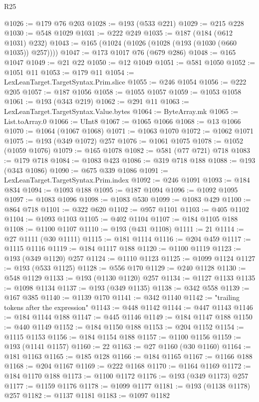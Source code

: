 \begin{lexlean}{R25}
\begin{coremodule}
@1026 := @179 @76 @203
@1028 := @193 (@533 @221)
@1029 := @215 @228
@1030 := @548 @1029
@1031 := @222 @249
@1035 := @187 (@184 (@612 @1031) @232)
@1043 := @165 (@1024 (@1026 (@1028 (@193 (@1030 (@660 @1035)) @257))))
@1047 := @173 @1017 @76 (@679 @286)
@1048 := @165 @1047
@1049 := @21 @22
@1050 := @12 @1049
@1051 := @581 @1050
@1052 := @1051 @11
@1053 := @179 @11
@1054 := LexLeanTarget.TargetSyntax.Prim.slice
@1055 := @246 @1054
@1056 := @222 @205
@1057 := @187 @1056
@1058 := @1055 @1057
@1059 := @1053 @1058
@1061 := @193 (@343 @219)
@1062 := @291 @11
@1063 := LexLeanTarget.TargetSyntax.Value.bytes
@1064 := ByteArray.mk
@1065 := List.toArray.{0}
@1066 := UInt8
@1067 := @1065 @1066
@1068 := @13 @1066
@1070 := @1064 (@1067 @1068)
@1071 := @1063 @1070
@1072 := @1062 @1071
@1075 := @193 (@349 @1072) @257
@1076 := @1061 @1075
@1078 := @1052 (@1059 @1076)
@1079 := @165 @1078
@1082 := @581 (@77 @721) @718
@1083 := @179 @718
@1084 := @1083 @423
@1086 := @319 @718 @188
@1088 := @193 (@343 @1086)
@1090 := @675 @339 @1086
@1091 := LexLeanTarget.TargetSyntax.Prim.index
@1092 := @246 @1091
@1093 := @184 @834
@1094 := @1093 @188
@1095 := @187 @1094
@1096 := @1092 @1095
@1097 := @1083 @1096
@1098 := @1083 @530
@1099 := @1083 @429
@1100 := @864 @718
@1101 := @322 @620
@1102 := @957 @1101
@1103 := @405 @1102
@1104 := @1093 @1103
@1105 := @402 @1104
@1107 := @184 @1105 @188
@1108 := @1100 @1107
@1110 := @193 (@431 @1108)
@1111 := 21
@1114 := @27 @1111 (@30 @1111)
@1115 := @181 @1114
@1116 := @204 @459
@1117 := @1115 @1116
@1119 := @184 @1117 @188
@1120 := @1100 @1119
@1123 := @193 (@349 @1120) @257
@1124 := @1110 @1123
@1125 := @1099 @1124
@1127 := @193 (@533 @1125)
@1128 := @556 @170
@1129 := @240 @1128
@1130 := @548 @1129
@1133 := @193 (@1130 @1120) @257
@1134 := @1127 @1133
@1135 := @1098 @1134
@1137 := @193 (@349 @1135)
@1138 := @342 @558
@1139 := @167 @385
@1140 := @1139 @170
@1141 := @342 @1140
@1142 := "trailing tokens after the expression"
@1143 := @448 @1142
@1144 := @447 @1143
@1146 := @184 @1144 @188
@1147 := @445 @1146
@1149 := @184 @1147 @188
@1150 := @440 @1149
@1152 := @184 @1150 @188
@1153 := @204 @1152
@1154 := @1115 @1153
@1156 := @184 @1154 @188
@1157 := @1100 @1156
@1159 := @193 (@1141 @1157)
@1160 := 22
@1163 := @27 @1160 (@30 @1160)
@1164 := @181 @1163
@1165 := @185 @128
@1166 := @184 @1165
@1167 := @1166 @188
@1168 := @204 @1167
@1169 := @222 @1168
@1170 := @1164 @1169
@1172 := @184 @1170 @188
@1173 := @1100 @1172
@1176 := @193 (@349 @1173) @257
@1177 := @1159 @1176
@1178 := @1099 @1177
@1181 := @193 (@1138 @1178) @257
@1182 := @1137 @1181
@1183 := @1097 @1182

\end{coremodule}
\end{lexlean}
